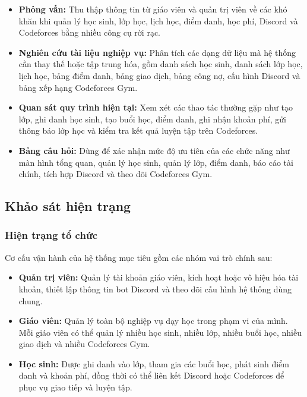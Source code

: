 \documentclass[12pt,a4paper]{article}
\begin{document}
\begin{itemize}[leftmargin=*]
    \item \textbf{Phỏng vấn:} Thu thập thông tin từ giáo viên và quản trị viên về
    các khó khăn khi quản lý học sinh, lớp học, lịch học, điểm danh, học phí,
    Discord và Codeforces bằng nhiều công cụ rời rạc.

    \item \textbf{Nghiên cứu tài liệu nghiệp vụ:} Phân tích các dạng dữ liệu mà
    hệ thống cần thay thế hoặc tập trung hóa, gồm danh sách học sinh, danh sách
    lớp học, lịch học, bảng điểm danh, bảng giao dịch, bảng công nợ, cấu hình
    Discord và bảng xếp hạng Codeforces Gym.

    \item \textbf{Quan sát quy trình hiện tại:} Xem xét các thao tác thường gặp
    như tạo lớp, ghi danh học sinh, tạo buổi học, điểm danh, ghi nhận khoản phí,
    gửi thông báo lớp học và kiểm tra kết quả luyện tập trên Codeforces.

    \item \textbf{Bảng câu hỏi:} Dùng để xác nhận mức độ ưu tiên của các chức
    năng như màn hình tổng quan, quản lý học sinh, quản lý lớp, điểm danh, báo cáo tài
    chính, tích hợp Discord và theo dõi Codeforces Gym.
\end{itemize}

\subsection{Khảo sát hiện trạng}

\subsubsection{Hiện trạng tổ chức}

Cơ cấu vận hành của hệ thống mục tiêu gồm các nhóm vai trò chính sau:

\begin{itemize}[leftmargin=*]
    \item \textbf{Quản trị viên:} Quản lý tài khoản giáo viên, kích hoạt hoặc vô
    hiệu hóa tài khoản, thiết lập thông tin bot Discord và theo dõi cấu hình hệ
    thống dùng chung.

    \item \textbf{Giáo viên:} Quản lý toàn bộ nghiệp vụ dạy học trong phạm vi của
    mình. Mỗi giáo viên có thể quản lý nhiều học sinh, nhiều lớp, nhiều buổi học,
    nhiều giao dịch và nhiều Codeforces Gym.

    \item \textbf{Học sinh:} Được ghi danh vào lớp, tham gia các buổi học, phát
    sinh điểm danh và khoản phí, đồng thời có thể liên kết Discord hoặc Codeforces
    để phục vụ giao tiếp và luyện tập.
\end{itemize}
\end{document}
